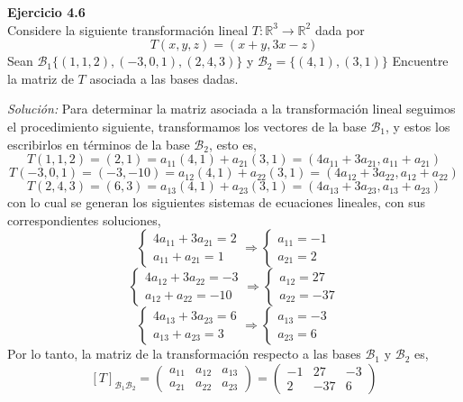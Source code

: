 \documentclass{article}
\newenvironment{problem}[2][Ejercicio]
    { \begin{mdframed}[backgroundcolor=gray!20] \textbf{#1 #2} \\}
    {  \end{mdframed}}
\newenvironment{solution}
    {\textit{Solución:}}
    {}
\begin{document}
\begin{problem}{4.6}
    Considere la siguiente transformación lineal $T : \mathbb{R}^3 \to \mathbb{R}^2$ dada por
\[
T(x,y,z) = (x+y,3x-z)
\]
Sean $\mathcal{B}_1 \{ (1, 1, 2), (-3, 0, 1), (2, 4, 3) \}$ y $\mathcal{B}_2 = \{ (4, 1) , (3, 1) \}$ Encuentre la matriz de $T$ asociada a las bases dadas.
\end{problem}
\begin{solution}
    Para determinar la matriz asociada a la transformación lineal seguimos el procedimiento siguiente, transformamos los vectores de la base $\mathcal{B}_1$, y estos los escribirlos en términos de la base $\mathcal{B}_2$, esto es,
\[
T(1, 1, 2) = (2, 1) = a_{11} (4, 1) + a_{21} (3, 1) = (4a_{11} + 3a_{21}, a_{11} + a_{21})
\]\[
T(-3, 0, 1) = (-3, -10) = a_{12} (4, 1) + a_{22} (3, 1) = (4a_{12} + 3a_{22}, a_{12} + a_{22})
\]\[
T(2, 4, 3) = (6, 3) = a_{13} (4, 1) + a_{23} (3, 1) = (4a_{13} + 3a_{23}, a_{13} + a_{23})
\]
con lo cual se generan los siguientes sistemas de ecuaciones lineales, con sus correspondientes soluciones,
\[
\begin{cases}
4a_{11} + 3a_{21}  = 2 \\
a_{11} + a_{21} = 1
\end{cases} \Rightarrow
\begin{cases}
a_{11} = -1 \\
a_{21} = 2
\end{cases}
\]\[
\begin{cases}
4a_{12} + 3a_{22}  = -3 \\
a_{12} + a_{22} = -10
\end{cases} \Rightarrow
\begin{cases}
a_{12} = 27 \\
a_{22} = -37
\end{cases}
\]\[
\begin{cases}
4a_{13} + 3a_{23}  = 6 \\
a_{13} + a_{23} = 3
\end{cases} \Rightarrow
\begin{cases}
a_{13} = -3 \\
a_{23} = 6
\end{cases}
\]
Por lo tanto, la matriz de la transformación respecto a las bases $\mathcal{B}_1$ y $\mathcal{B}_2$ es,
\[
[T]_{\mathcal{B}_1\mathcal{B}_2} = \begin{pmatrix}
a_{11} & a_{12} & a_{13} \\
a_{21} & a_{22} & a_{23}
\end{pmatrix} = 
\begin{pmatrix}
-1 & 27 & -3 \\
2 & -37 & 6
\end{pmatrix}
\]
\end{solution}
\end{document}
